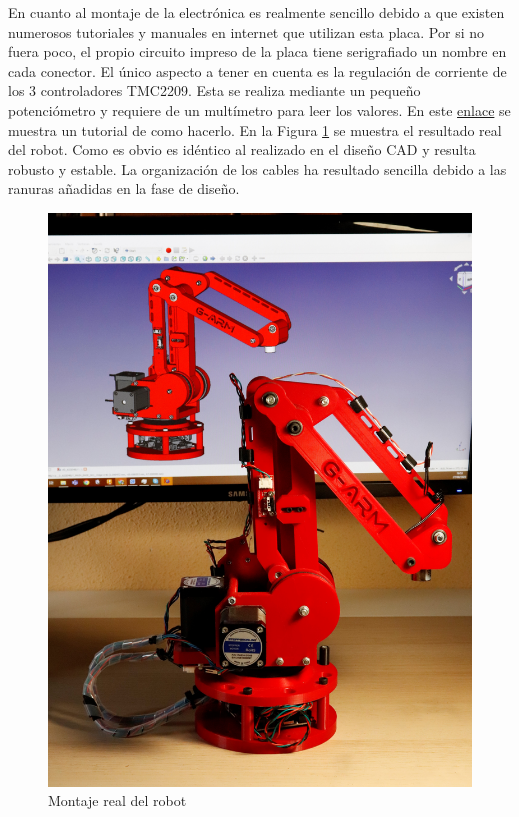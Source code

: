 En cuanto al montaje de la electrónica es realmente sencillo debido a que existen numerosos tutoriales 
y manuales en internet que utilizan esta placa. Por si no fuera poco, el propio circuito impreso de la 
placa tiene serigrafiado un nombre en cada conector. El único aspecto a tener en cuenta es la regulación 
de corriente de los 3 controladores TMC2209. Esta se realiza mediante un pequeño potenciómetro y requiere 
de un multímetro para leer los valores. En este \href{https://all3dp.com/2/vref-calculator-tmc2209-tmc2208-a4988/}{enlace} se muestra un tutorial de como hacerlo.  
\newpage
En la Figura \ref{fig:montaje_real} se muestra el resultado real del robot. Como es obvio es idéntico al realizado en el diseño CAD y resulta robusto 
y estable. La organización de los cables ha resultado sencilla debido a las ranuras añadidas en la fase de diseño.
\begin{figure} [h!]
  \begin{center}
    \includegraphics[width=14cm]{figs/montaje_real.jpg}
  \end{center}
  \caption{Montaje real del robot}
  \label{fig:montaje_real}
  \end{figure}\ 